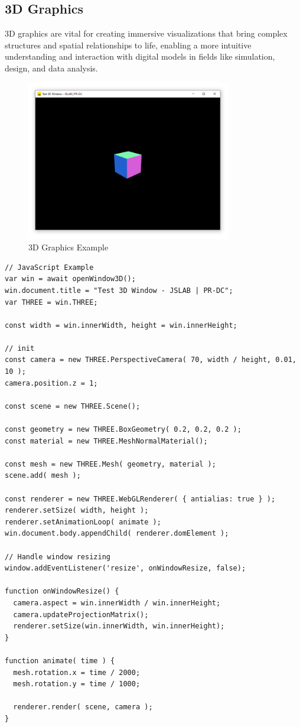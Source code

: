 \documentclass[12pt,a4paper]{article}
\begin{document}
\subsection{3D Graphics}
\label{sec:3d-graphics}

3D graphics are vital for creating immersive visualizations that bring complex structures and spatial relationships to life, enabling a more intuitive understanding and interaction with digital models in fields like simulation, design, and data analysis.

\begin{figure}[H]
    \centering
    \includegraphics[width=0.8\textwidth]{resources/JSLAB_3D_graphics.png}
    \caption{3D Graphics Example}
    \label{fig:3d-graphics}
\end{figure}

\begin{lstlisting}[style=JavaScriptStyle]
// JavaScript Example
var win = await openWindow3D();
win.document.title = "Test 3D Window - JSLAB | PR-DC";
var THREE = win.THREE;

const width = win.innerWidth, height = win.innerHeight;

// init
const camera = new THREE.PerspectiveCamera( 70, width / height, 0.01, 10 );
camera.position.z = 1;

const scene = new THREE.Scene();

const geometry = new THREE.BoxGeometry( 0.2, 0.2, 0.2 );
const material = new THREE.MeshNormalMaterial();

const mesh = new THREE.Mesh( geometry, material );
scene.add( mesh );

const renderer = new THREE.WebGLRenderer( { antialias: true } );
renderer.setSize( width, height );
renderer.setAnimationLoop( animate );
win.document.body.appendChild( renderer.domElement );

// Handle window resizing
window.addEventListener('resize', onWindowResize, false);

function onWindowResize() {
  camera.aspect = win.innerWidth / win.innerHeight;
  camera.updateProjectionMatrix();
  renderer.setSize(win.innerWidth, win.innerHeight);
}

function animate( time ) {
  mesh.rotation.x = time / 2000;
  mesh.rotation.y = time / 1000;
  
  renderer.render( scene, camera );
}
\end{lstlisting}
\end{document}
